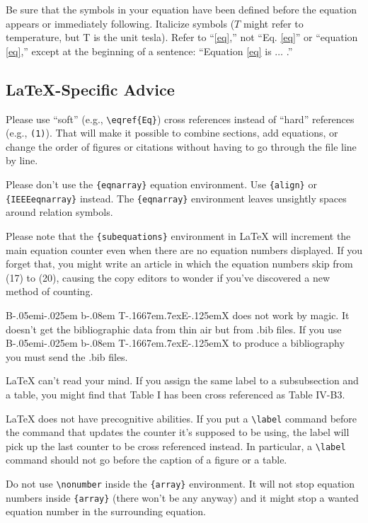 \documentclass{ieeeaccess}
\def\BibTeX{{\rm B\kern-.05em{\sc i\kern-.025em b}\kern-.08em
    T\kern-.1667em\lower.7ex\hbox{E}\kern-.125emX}}
\begin{document}
Be sure that the symbols in your equation have been defined before the
equation appears or immediately following. Italicize symbols ($T$ might refer
to temperature, but T is the unit tesla). Refer to ``\eqref{eq},'' not ``Eq. \eqref{eq}''
or ``equation \eqref{eq},'' except at the beginning of a sentence: ``Equation \eqref{eq}
is $\ldots$ .''

\subsection{LaTeX-Specific Advice}

Please use ``soft'' (e.g., \verb|\eqref{Eq}|) cross references instead
of ``hard'' references (e.g., \verb|(1)|). That will make it possible
to combine sections, add equations, or change the order of figures or
citations without having to go through the file line by line.

Please don't use the \verb|{eqnarray}| equation environment. Use
\verb|{align}| or \verb|{IEEEeqnarray}| instead. The \verb|{eqnarray}|
environment leaves unsightly spaces around relation symbols.

Please note that the \verb|{subequations}| environment in {\LaTeX}
will increment the main equation counter even when there are no
equation numbers displayed. If you forget that, you might write an
article in which the equation numbers skip from (17) to (20), causing
the copy editors to wonder if you've discovered a new method of
counting.

{\BibTeX} does not work by magic. It doesn't get the bibliographic
data from thin air but from .bib files. If you use {\BibTeX} to produce a
bibliography you must send the .bib files.

{\LaTeX} can't read your mind. If you assign the same label to a
subsubsection and a table, you might find that Table I has been cross
referenced as Table IV-B3.

{\LaTeX} does not have precognitive abilities. If you put a
\verb|\label| command before the command that updates the counter it's
supposed to be using, the label will pick up the last counter to be
cross referenced instead. In particular, a \verb|\label| command
should not go before the caption of a figure or a table.

Do not use \verb|\nonumber| inside the \verb|{array}| environment. It
will not stop equation numbers inside \verb|{array}| (there won't be
any anyway) and it might stop a wanted equation number in the
surrounding equation.
\end{document}
